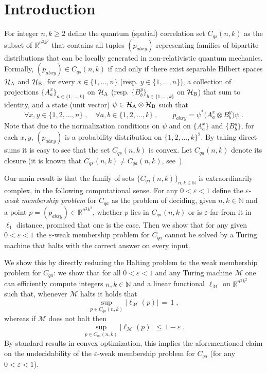\documentclass[11pt]{article}
\theoremstyle{definition}
\newcommand{\N}{\ensuremath{\mathbb{N}}}
\newcommand{\R}{\ensuremath{\mathbb{R}}}
\newcommand{\mH}{\ensuremath{\mathcal{H}}}
\newcommand{\cM}{\ensuremath{\mathcal{M}}}
\newcommand{\eps}{\varepsilon}
\newcommand{\labelstyle}[1]{\ensuremath{\textsc{#1}}\xspace}
\newcommand{\alice}{\labelstyle{A}}
\newcommand{\bob}{\labelstyle{B}}
\begin{document}
\tableofcontents

\section{Introduction}
\label{sec:intro}

For integer $n,k\geq 2$ define the quantum (spatial) correlation set $C_{qs}(n,k)$ as the subset of $\R^{n^2k^2}$ that contains all tuples $(p_{abxy})$ representing families of bipartite distributions that can be locally generated in non-relativistic quantum mechanics. Formally, $(p_{abxy}) \in C_{qs}(n,k)$ if and only if there exist separable Hilbert spaces $\mH_\alice$ and $\mH_\bob$, for every $x\in\{1,\ldots,n\}$ (resp. $y\in\{1,\ldots,n\}$), a collection of projections $\{A^x_a\}_{a\in\{1,\ldots,k\}}$ on $\mH_\alice$ (resp. $\{B^y_b\}_{b\in\{1,\ldots,k\}}$ on $\mH_\bob$) that sum to identity, and a state (unit vector) $\psi \in \mH_\alice \otimes \mH_\bob$ such that 
\begin{equation}\label{eq:intro-qs}
  \forall x,y\in \{1, 2, \ldots, n\}\;,\quad\forall a,b\in\{1, 2, \ldots, k\}\;,
  \qquad p_{abxy} = \psi^* \big( A^x_a \otimes B^y_b\big) \psi\;.
\end{equation}
Note that due to the normalization conditions on $\psi$ and on $\{A^x_a\}$ and
$\{B^y_b\}$, for each $x,y$, $(p_{abxy})$ is a probability distribution on
$\{1, 2, \ldots, k\}^2$.
By taking direct sums it is easy to see that the set $C_{qs}(n,k)$ is convex. Let $C_{qa}(n,k)$ denote its closure (it is known that $C_{qs}(n,k) \neq C_{qa}(n,k)$, see~\cite{slofstra2019set}).

Our main result is that the family of sets $\{C_{qa}(n,k)\}_{n,k \in \N}$ is extraordinarily complex, in the following computational sense. For any $0<\eps<1$ define the $\eps$-\emph{weak membership problem} for $C_{qa}$ as the problem of deciding, given $n,k \in \N$ and a point $p=(p_{abxy}) \in \R^{n^2 k^2}$, whether $p$ lies in $C_{qa}(n,k)$ or is $\eps$-far from it in $\ell_1$ distance, promised that one is the case. Then we show that for any given $0<\eps<1$ the  $\eps$-{weak membership problem} for $C_{qa}$ cannot be solved by a Turing machine that halts with the correct answer on every input.

We show this by directly reducing the Halting problem to the weak membership problem for $C_{qa}$: we show that for all $0 < \eps < 1$ and any Turing machine $\cM$ one can efficiently compute integers $n,k\in \N$ and a linear functional $\ell_\cM$ on $\R^{n^2k^2}$ such that, whenever $\cM$ halts it holds that 
\begin{equation}\label{eq:intro-win-1}
\sup_{p\in C_{qa}(n,k)} \big|\ell_\cM(p)\big| \,=\,1\;,
\end{equation}
 whereas if $\cM$ does not halt then 
\begin{equation}\label{eq:intro-win-2}
\sup_{p\in C_{qa}(n,k)} \big|\ell_\cM(p)\big| \,\leq\, 1 - \eps\;.
\end{equation}
By standard results in convex optimization, this implies the aforementioned claim on the undecidability of the $\eps$-weak membership problem for $C_{qa}$ (for any $0<\eps<1$). 
\end{document}
